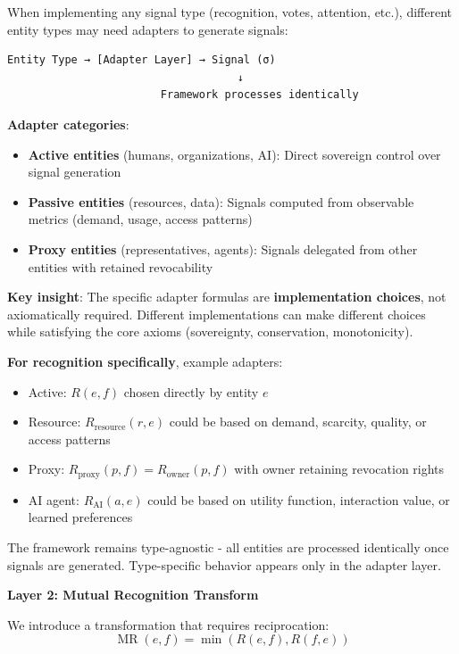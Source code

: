 \documentclass[11pt,a4paper]{article}
\theoremstyle{definition}
\theoremstyle{remark}
\DeclareMathOperator{\MR}{MR}
\begin{document}
When implementing any signal type (recognition, votes, attention, etc.), different entity types may need adapters to generate signals:

\begin{center}
\begin{verbatim}
Entity Type → [Adapter Layer] → Signal (σ)
                                    ↓
                        Framework processes identically
\end{verbatim}
\end{center}

\textbf{Adapter categories}:
\begin{itemize}
\item \textbf{Active entities} (humans, organizations, AI): Direct sovereign control over signal generation
\item \textbf{Passive entities} (resources, data): Signals computed from observable metrics (demand, usage, access patterns)
\item \textbf{Proxy entities} (representatives, agents): Signals delegated from other entities with retained revocability
\end{itemize}

\textbf{Key insight}: The specific adapter formulas are \textbf{implementation choices}, not axiomatically required. Different implementations can make different choices while satisfying the core axioms (sovereignty, conservation, monotonicity).

\textbf{For recognition specifically}, example adapters:
\begin{itemize}
\item Active: $R(e,f)$ chosen directly by entity $e$
\item Resource: $R_{\text{resource}}(r,e)$ could be based on demand, scarcity, quality, or access patterns
\item Proxy: $R_{\text{proxy}}(p,f) = R_{\text{owner}}(p,f)$ with owner retaining revocation rights
\item AI agent: $R_{\text{AI}}(a,e)$ could be based on utility function, interaction value, or learned preferences
\end{itemize}

The framework remains type-agnostic - all entities are processed identically once signals are generated. Type-specific behavior appears only in the adapter layer.

\textbf{Layer 2: Mutual Recognition Transform}

We introduce a transformation that requires reciprocation:
\[ \MR(e,f) = \min(R(e,f), R(f,e)) \]
\end{document}
